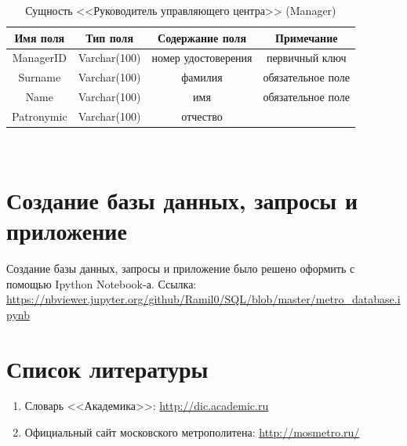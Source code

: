\documentclass[a4paper,10pt]{article}
\theoremstyle{plain} %
\theoremstyle{definition} %
\theoremstyle{remark} %
\theoremstyle{definition}
\begin{document}
\begin{table}[h!]
\centering
\begin{tabular}{|c|c|c|c|}
\hline
    Имя поля & Тип поля & Содержание поля & Примечание \\
    \hline
    ManagerID & Varchar(100) & номер удостоверения & первичный ключ\\
    Surname & Varchar(100) & фамилия & обязательное поле \\
    Name & Varchar(100) & имя & обязательное поле \\
    Patronymic & Varchar(100) & отчество & \\
    \hline
\end{tabular}
    \caption{Сущность <<Руководитель управляющего центра>> (Manager)}
\end{table}
\newpage~
\section{Создание базы данных, запросы и приложение}
Создание базы данных, запросы и приложение было решено оформить с помощью Ipython Notebook-а. Ссылка: \url{https://nbviewer.jupyter.org/github/Ramil0/SQL/blob/master/metro_database.ipynb}


\section{Список литературы}
\begin{enumerate}
    \item Словарь <<Академика>>: \url{http://dic.academic.ru}
    \item Официальный сайт московского метрополитена: \url{http://mosmetro.ru/}
\end{enumerate}
\end{document}

